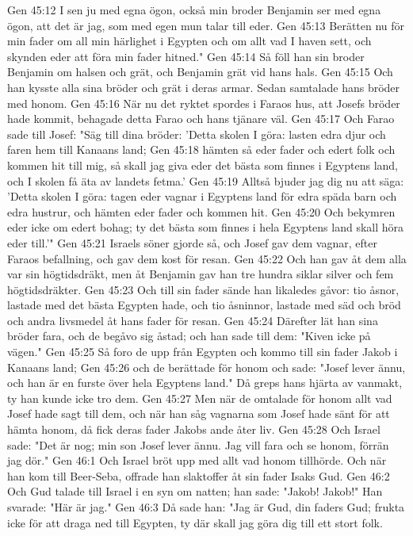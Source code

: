 Gen 45:12  I sen ju med egna ögon, också min broder Benjamin ser med egna ögon, att det är jag, som med egen mun talar till eder.
Gen 45:13  Berätten nu för min fader om all min härlighet i Egypten och om allt vad I haven sett, och skynden eder att föra min fader hitned."
Gen 45:14  Så föll han sin broder Benjamin om halsen och grät, och Benjamin grät vid hans hals.
Gen 45:15  Och han kysste alla sina bröder och grät i deras armar. Sedan samtalade hans bröder med honom.
Gen 45:16  När nu det ryktet spordes i Faraos hus, att Josefs bröder hade kommit, behagade detta Farao och hans tjänare väl.
Gen 45:17  Och Farao sade till Josef: "Säg till dina bröder: 'Detta skolen I göra: lasten edra djur och faren hem till Kanaans land;
Gen 45:18  hämten så eder fader och edert folk och kommen hit till mig, så skall jag giva eder det bästa som finnes i Egyptens land, och I skolen få äta av landets fetma.'
Gen 45:19  Alltså bjuder jag dig nu att säga: 'Detta skolen I göra: tagen eder vagnar i Egyptens land för edra späda barn och edra hustrur, och hämten eder fader och kommen hit.
Gen 45:20  Och bekymren eder icke om edert bohag; ty det bästa som finnes i hela Egyptens land skall höra eder till.'"
Gen 45:21  Israels söner gjorde så, och Josef gav dem vagnar, efter Faraos befallning, och gav dem kost för resan.
Gen 45:22  Och han gav åt dem alla var sin högtidsdräkt, men åt Benjamin gav han tre hundra siklar silver och fem högtidsdräkter.
Gen 45:23  Och till sin fader sände han likaledes gåvor: tio åsnor, lastade med det bästa Egypten hade, och tio åsninnor, lastade med säd och bröd och andra livsmedel åt hans fader för resan.
Gen 45:24  Därefter lät han sina bröder fara, och de begåvo sig åstad; och han sade till dem: "Kiven icke på vägen."
Gen 45:25  Så foro de upp från Egypten och kommo till sin fader Jakob i Kanaans land;
Gen 45:26  och de berättade för honom och sade: "Josef lever ännu, och han är en furste över hela Egyptens land." Då greps hans hjärta av vanmakt, ty han kunde icke tro dem.
Gen 45:27  Men när de omtalade för honom allt vad Josef hade sagt till dem, och när han såg vagnarna som Josef hade sänt för att hämta honom, då fick deras fader Jakobs ande åter liv.
Gen 45:28  Och Israel sade: "Det är nog; min son Josef lever ännu. Jag vill fara och se honom, förrän jag dör."
Gen 46:1  Och Israel bröt upp med allt vad honom tillhörde. Och när han kom till Beer-Seba, offrade han slaktoffer åt sin fader Isaks Gud.
Gen 46:2  Och Gud talade till Israel i en syn om natten; han sade: "Jakob! Jakob!" Han svarade: "Här är jag."
Gen 46:3  Då sade han: "Jag är Gud, din faders Gud; frukta icke för att draga ned till Egypten, ty där skall jag göra dig till ett stort folk.
